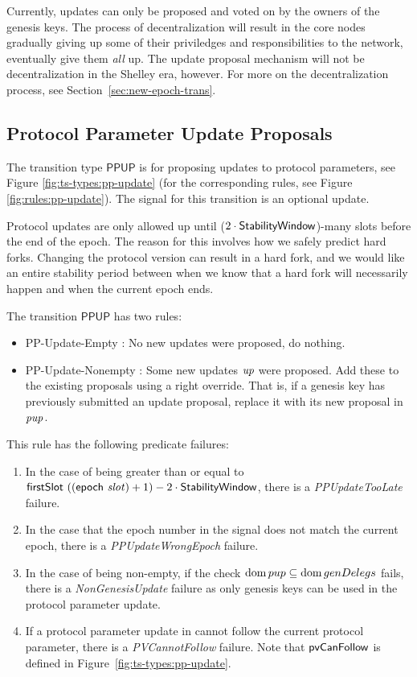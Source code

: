Currently, updates can only be proposed and voted on by the owners of the genesis keys.
The process of decentralization will result in the core nodes gradually giving up
some of their priviledges and responsibilities to the network,
eventually give them \textit{all} up.
The update proposal mechanism will not be decentralization in the Shelley era, however.
For more on the decentralization process, see Section~\ref{sec:new-epoch-trans}.

\subsection{Protocol Parameter Update Proposals}
\label{sec:pp-proposals}

The transition type $\mathsf{PPUP}$ is for proposing updates to protocol
parameters, see Figure \ref{fig:ts-types:pp-update} (for the corresponding rules,
see Figure \ref{fig:rules:pp-update}).
The signal for this transition is an optional update.

Protocol updates are only allowed up until ($2\cdot\mathsf{StabilityWindow}$)-many slots before the
end of the epoch. The reason for this involves how we safely predict hard forks.
Changing the protocol version can result in a hard fork, and we would like an
entire stability period between when we know that a hard fork will necessarily happen
and when the current epoch ends.

The transition $\mathsf{PPUP}$ has two rules:
\begin{itemize}
  \item PP-Update-Empty : No new updates were proposed, do nothing.
  \item PP-Update-Nonempty : Some new updates $\mathit{up}$ were proposed.
  Add these to the existing proposals using a right override. That is, if a genesis key
  has previously submitted an update proposal, replace it with its new
  proposal in $\mathit{pup}$.
\end{itemize}

This rule has the following predicate failures:

\begin{enumerate}
\item In the case of  being greater than or equal to
  $\mathsf{firstSlot}~((\mathsf{epoch}~\mathit{slot}) + 1) - 2\cdot\mathsf{StabilityWindow}$, there is
  a \emph{PPUpdateTooLate} failure.
\item In the case that the epoch number in the signal does not match the current epoch,
  there is a \emph{PPUpdateWrongEpoch} failure.
\item In the case of  being non-empty, if the check $\operatorname{dom} pup \subseteq
  \operatorname{dom} genDelegs$ fails, there is a \emph{NonGenesisUpdate} failure as only genesis keys
  can be used in the protocol parameter update.
\item If a protocol parameter update in  cannot follow the current
  protocol parameter, there is a \emph{PVCannotFollow} failure.
  Note that $\mathsf{pvCanFollow}$ is defined in Figure~\ref{fig:ts-types:pp-update}.
\end{enumerate}

